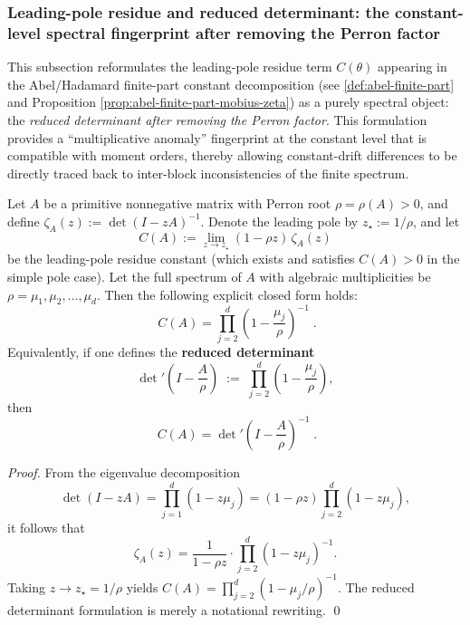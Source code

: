 \subsubsection{Leading-pole residue and reduced determinant: the constant-level spectral fingerprint after removing the Perron factor}\label{subsec:finite-part-reduced-determinant-residue}
This subsection reformulates the leading-pole residue term \(C(\theta)\) appearing in the Abel/Hadamard finite-part constant decomposition (see \ref{def:abel-finite-part} and Proposition \ref{prop:abel-finite-part-mobius-zeta})
as a purely spectral object: the \emph{reduced determinant after removing the Perron factor}.
This formulation provides a ``multiplicative anomaly'' fingerprint at the constant level that is compatible with moment orders, thereby allowing constant-drift differences to be directly traced back to inter-block inconsistencies of the finite spectrum.

\begin{proposition}\label{prop:finite-part-residue-reduced-determinant}
Let \(A\) be a primitive nonnegative matrix with Perron root \(\rho=\rho(A)>0\), and define
\(
\zeta_A(z):=\det(I-zA)^{-1}
\).
Denote the leading pole by \(z_\star:=1/\rho\), and let
\[
C(A):=\lim_{z\to z_\star}(1-\rho z)\,\zeta_A(z)
\]
be the leading-pole residue constant (which exists and satisfies \(C(A)>0\) in the simple pole case).
Let the full spectrum of \(A\) with algebraic multiplicities be \(\rho=\mu_1,\mu_2,\dots,\mu_d\).
Then the following explicit closed form holds:
\[
\boxed{\;
C(A)=\prod_{j=2}^{d}\left(1-\frac{\mu_j}{\rho}\right)^{-1}\; }.
\]
Equivalently, if one defines the \textbf{reduced determinant}
\[
\det\nolimits'\!\left(I-\frac{A}{\rho}\right)
\;:=\;
\prod_{j=2}^{d}\left(1-\frac{\mu_j}{\rho}\right),
\]
then
\[
\boxed{\;
C(A)=\det\nolimits'\!\left(I-\frac{A}{\rho}\right)^{-1}\; }.
\]
\end{proposition}
\begin{proof}
From the eigenvalue decomposition
\[
\det(I-zA)=\prod_{j=1}^{d}(1-z\mu_j)=(1-\rho z)\prod_{j=2}^{d}(1-z\mu_j),
\]
it follows that
\[
\zeta_A(z)=\frac{1}{1-\rho z}\cdot \prod_{j=2}^{d}(1-z\mu_j)^{-1}.
\]
Taking \(z\to z_\star=1/\rho\) yields
\(
C(A)=\prod_{j=2}^{d}(1-\mu_j/\rho)^{-1}
\).
The reduced determinant formulation is merely a notational rewriting. \qed
\end{proof}

